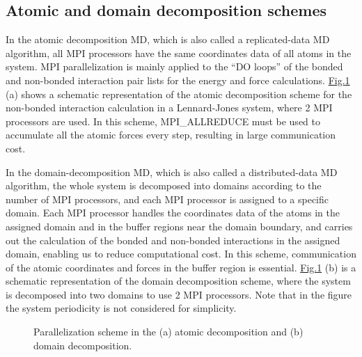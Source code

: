 \documentclass[a4paper,11pt,oneside,english]{sphinxmanual}
\begin{document}
\subsection{Atomic and domain decomposition schemes}
\label{\detokenize{02_Available_Programs:atomic-and-domain-decomposition-schemes}}
In the atomic decomposition MD, which is also called a replicated-data MD algorithm,
all MPI processors have the same coordinates data of all atoms in the system.
MPI parallelization is mainly applied to the “DO loops” of the bonded and
non-bonded interaction pair lists for the energy and force calculations.
\hyperref[\detokenize{02_Available_Programs:parallel-scheme}]{Fig.\@ \ref{\detokenize{02_Available_Programs:parallel-scheme}}} (a) shows a schematic representation of the atomic decomposition scheme
for the non-bonded interaction calculation in a Lennard-Jones system,
where 2 MPI processors are used.
In this scheme, MPI\_ALLREDUCE must be used to accumulate all the atomic forces every step,
resulting in large communication cost.

In the domain-decomposition MD, which is also called a
distributed-data MD algorithm, the whole system is decomposed into domains
according to the number of MPI processors, and each MPI processor is assigned to a specific domain.
Each MPI processor handles the coordinates data of the atoms
in the assigned domain and in the buffer regions near the domain boundary,
and carries out the calculation of the bonded and non-bonded interactions
in the assigned domain, enabling us to reduce computational cost.
In this scheme, communication of the atomic coordinates and
forces in the buffer region is essential.
\hyperref[\detokenize{02_Available_Programs:parallel-scheme}]{Fig.\@ \ref{\detokenize{02_Available_Programs:parallel-scheme}}} (b) is a schematic representation of the domain decomposition scheme,
where the system is decomposed into two domains to use 2 MPI processors.
Note that in the figure the system periodicity is not considered for simplicity.

\begin{figure}[htbp]
\centering
\capstart

\noindent{}
\caption{Parallelization scheme in the (a) atomic decomposition and (b) domain decomposition.}\label{\detokenize{02_Available_Programs:parallel-scheme}}\end{figure}
\end{document}
